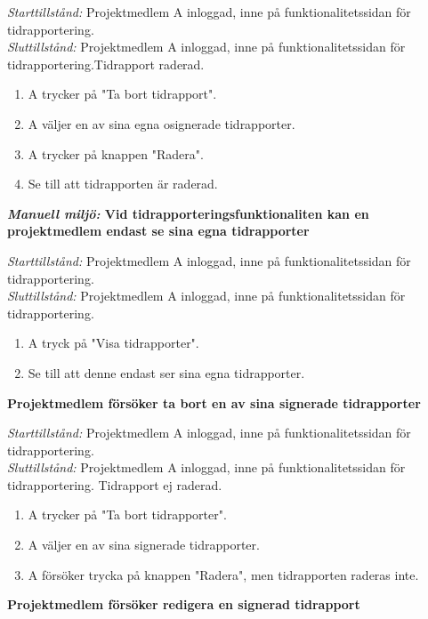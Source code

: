 \documentclass[a4paper]{article}
\begin{document}
\begin{FT}
\emph{Starttillstånd:} Projektmedlem A inloggad, inne på funktionalitetssidan för tidrapportering.\\
\emph{Sluttillstånd:} Projektmedlem A inloggad, inne på funktionalitetssidan för tidrapportering.Tidrapport raderad.

\begin{enumerate}
\item A trycker på "Ta bort tidrapport".
\item A väljer en av sina egna osignerade tidrapporter.
\item A trycker på knappen "Radera".
\item Se till att tidrapporten är raderad.
\end{enumerate}

\item
\textbf{\emph{Manuell miljö:} Vid tidrapporteringsfunktionaliten kan en projektmedlem endast se sina egna tidrapporter} 

\emph{Starttillstånd:} Projektmedlem A inloggad, inne på funktionalitetssidan för tidrapportering.\\
\emph{Sluttillstånd:} Projektmedlem A inloggad, inne på funktionalitetssidan för tidrapportering.

\begin{enumerate}
\item A tryck på "Visa tidrapporter".
\item Se till att denne endast ser sina egna tidrapporter.
\end{enumerate}


\item
\textbf{Projektmedlem försöker ta bort en av sina signerade tidrapporter}

\emph{Starttillstånd:} Projektmedlem A inloggad, inne på funktionalitetssidan för tidrapportering.\\
\emph{Sluttillstånd:} Projektmedlem A inloggad, inne på funktionalitetssidan för tidrapportering. Tidrapport ej raderad.

\begin{enumerate}
\item A trycker på "Ta bort tidrapporter".
\item A väljer en av sina signerade tidrapporter.
\item A försöker trycka på knappen "Radera", men tidrapporten raderas inte.
\end{enumerate}

\item
\textbf{Projektmedlem försöker redigera en signerad tidrapport}


\end{FT}
\end{document}
